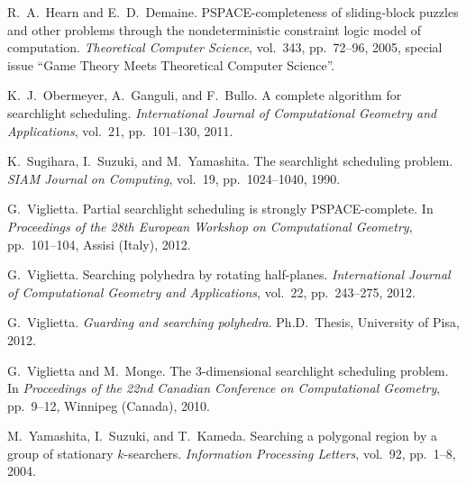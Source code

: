 \documentclass{style}
\begin{document}
\begin{thebibliography}{9}

R.~A.~Hearn and E.~D.~Demaine.
PSPACE-completeness of sliding-block puzzles and other problems through the nondeterministic constraint logic model of computation.
{\it Theoretical Computer Science}, vol.~343, pp.~72--96, 2005, special issue ``Game Theory Meets Theoretical Computer Science''.

K.~J.~Obermeyer, A.~Ganguli, and F.~Bullo.
A complete algorithm for searchlight scheduling.
{\it International Journal of Computational Geometry and Applications}, vol.~21, pp.~101--130, 2011.

K.~Sugihara, I.~Suzuki, and M.~Yamashita.
The searchlight scheduling problem.
{\it SIAM Journal on Computing}, vol.~19, pp.~1024--1040, 1990.

G.~Viglietta.
Partial searchlight scheduling is strongly PSPACE-complete.
In {\it Proceedings of the 28th European Workshop on Computational Geometry}, pp.~101--104, Assisi (Italy), 2012.

G.~Viglietta.
Searching polyhedra by rotating half-planes.
{\it International Journal of Computational Geometry and Applications}, vol.~22, pp.~243--275, 2012.

G.~Viglietta.
{\it Guarding and searching polyhedra}.
Ph.D.~Thesis, University of Pisa, 2012.

G.~Viglietta and M.~Monge.
The 3-dimensional searchlight scheduling problem.
In {\it Proceedings of the 22nd Canadian Conference on Computational Geometry}, pp.~9--12, Winnipeg (Canada), 2010.

M.~Yamashita, I.~Suzuki, and T.~Kameda.
Searching a polygonal region by a group of stationary $k$-searchers.
{\it Information Processing Letters}, vol.~92, pp.~1--8, 2004.

\end{thebibliography}
\end{document}
